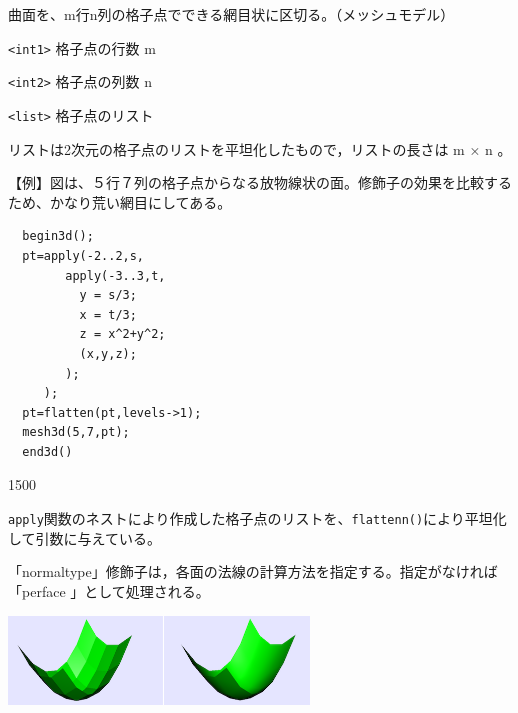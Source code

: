 \documentclass[papersize,a4paper,12pt,uplatex]{jsarticle}
\begin{document}
曲面を、m行n列の格子点でできる網目状に区切る。（メッシュモデル）

\verb|<int1>| 格子点の行数 m

\verb|<int2>| 格子点の列数 n

\verb|<list>| 格子点のリスト

リストは2次元の格子点のリストを平坦化したもので，リストの長さは m × n 。

\vspace{\baselineskip}
\noindent
【例】図は、５行７列の格子点からなる放物線状の面。修飾子の効果を比較するため、かなり荒い網目にしてある。

\begin{verbatim}
  begin3d();
  pt=apply(-2..2,s,
        apply(-3..3,t,
          y = s/3; 
          x = t/3;
          z = x^2+y^2;
          (x,y,z);
        );
     );
  pt=flatten(pt,levels->1);
  mesh3d(5,7,pt);
  end3d()
\end{verbatim}

\begin{layer}{150}{0}
\end{layer}

\verb|apply|関数のネストにより作成した格子点のリストを、\verb|flattenn()|により平坦化して引数に与えている。

\vspace{\baselineskip}
 

\vspace{\baselineskip}
「normaltype」修飾子は，各面の法線の計算方法を指定する。指定がなければ「perface 」として処理される。

\vspace{\baselineskip}
 

\vspace{\baselineskip}
\hspace{20mm} \includegraphics[bb=0 0 600 178 , width=8cm]{Cfig/nomal.png}
\end{document}
